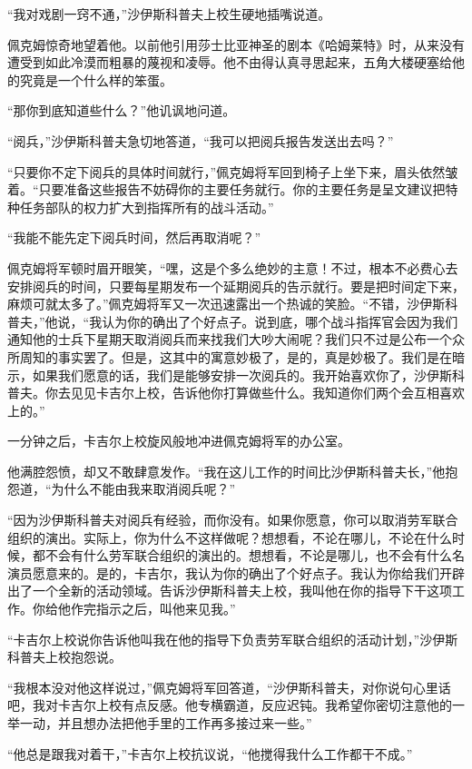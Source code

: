     “我对戏剧一窍不通，”沙伊斯科普夫上校生硬地插嘴说道。

    佩克姆惊奇地望着他。以前他引用莎士比亚神圣的剧本《哈姆莱特》时，从来没有遭受到如此冷漠而粗暴的蔑视和凌辱。他不由得认真寻思起来，五角大楼硬塞给他的究竟是一个什么样的笨蛋。

    “那你到底知道些什么？”他讥讽地问道。

    “阅兵，”沙伊斯科普夫急切地答道，“我可以把阅兵报告发送出去吗？”

    “只要你不定下阅兵的具体时间就行，”佩克姆将军回到椅子上坐下来，眉头依然皱着。“只要准备这些报告不妨碍你的主要任务就行。你的主要任务是呈文建议把特种任务部队的权力扩大到指挥所有的战斗活动。”

    “我能不能先定下阅兵时间，然后再取消呢？”

    佩克姆将军顿时眉开眼笑，“嘿，这是个多么绝妙的主意！不过，根本不必费心去安排阅兵的时间，只要每星期发布一个延期阅兵的告示就行。要是把时间定下来，麻烦可就太多了。”佩克姆将军又一次迅速露出一个热诚的笑脸。“不错，沙伊斯科普夫，”他说，“我认为你的确出了个好点子。说到底，哪个战斗指挥官会因为我们通知他的士兵下星期天取消阅兵而来找我们大吵大闹呢？我们只不过是公布一个众所周知的事实罢了。但是，这其中的寓意妙极了，是的，真是妙极了。我们是在暗示，如果我们愿意的话，我们是能够安排一次阅兵的。我开始喜欢你了，沙伊斯科普夫。你去见见卡吉尔上校，告诉他你打算做些什么。我知道你们两个会互相喜欢上的。”

    一分钟之后，卡吉尔上校旋风般地冲进佩克姆将军的办公室。

    他满腔怨愤，却又不敢肆意发作。“我在这儿工作的时间比沙伊斯科普夫长，”他抱怨道，“为什么不能由我来取消阅兵呢？”

    “因为沙伊斯科普夫对阅兵有经验，而你没有。如果你愿意，你可以取消劳军联合组织的演出。实际上，你为什么不这样做呢？想想看，不论在哪儿，不论在什么时候，都不会有什么劳军联合组织的演出的。想想看，不论是哪儿，也不会有什么名演员愿意来的。是的，卡吉尔，我认为你的确出了个好点子。我认为你给我们开辟出了一个全新的活动领域。告诉沙伊斯科普夫上校，我叫他在你的指导下干这项工作。你给他作完指示之后，叫他来见我。”

    “卡吉尔上校说你告诉他叫我在他的指导下负责劳军联合组织的活动计划，”沙伊斯科普夫上校抱怨说。

    “我根本没对他这样说过，”佩克姆将军回答道，“沙伊斯科普夫，对你说句心里话吧，我对卡吉尔上校有点反感。他专横霸道，反应迟钝。我希望你密切注意他的一举一动，并且想办法把他手里的工作再多接过来一些。”

    “他总是跟我对着干，”卡吉尔上校抗议说，“他搅得我什么工作都干不成。”

